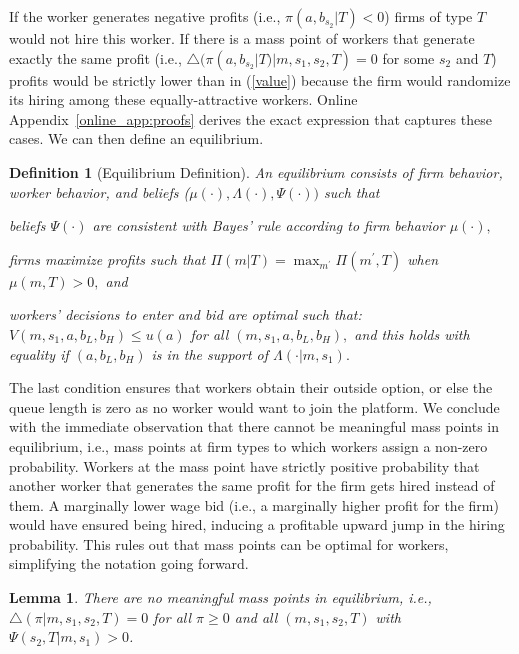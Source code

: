 \documentclass[12pt]{article}
\newtheorem*{definition*}{Definition}
\newtheorem*{lemma*}{Lemma}
\begin{document}
If the worker generates negative profits (i.e., $\pi (a,b_{s_2}|T) < 0$) firms of type $T$ would not hire this worker. If there is a mass point of workers that generate exactly the same profit (i.e., $\bigtriangleup (\pi
(a,b_{s_2}|T)|m,s_{1},s_{2},T)=0$ for some $s_2$ and $T$) profits would be strictly lower than in (\ref{value}) because the firm would randomize its hiring among these equally-attractive workers. Online Appendix~\ref{online_app:proofs} derives the exact expression that captures these cases. We can then define an equilibrium.

\begin{definition*}[Equilibrium Definition]
An equilibrium consists of firm behavior, worker behavior, and beliefs ($%
\mu (\cdot ),\Lambda (\cdot ),\Psi (\cdot ))$ such that
\begin{enumerate}[label={[\arabic*]}]
\item beliefs $\Psi (\cdot )$ are consistent with Bayes' rule according
to firm behavior $\mu (\cdot ),$

\item firms maximize profits such that $\Pi (m|T)=\max_{m^{\prime }}\Pi
(m^{\prime },T)$ when $\mu (m,T)>0,$ and

\item workers' decisions to enter and bid are optimal such that: $%
V(m,s_{1},a,b_{L},b_{H})\leq u(a)$ for all $(m,s_{1},a,b_{L},b_{H}),$ and
this holds with equality if $(a,b_{L},b_{H})$ is in the support of $\Lambda
(\cdot |m,s_{1}).$
\end{enumerate}
\end{definition*}

The last condition ensures that workers obtain their outside option, or else the queue length is zero as no worker would want to join the platform. 
We conclude with the immediate observation that there cannot be meaningful
mass points in equilibrium, i.e., mass points at firm types to which workers assign a non-zero probability. 
Workers at the mass point have strictly positive probability that another worker that generates the same profit for the firm gets hired instead of them. 
A marginally lower wage bid (i.e., a marginally higher profit for the firm) would have ensured being hired, inducing a profitable upward jump in the hiring probability. This rules out that mass points can be optimal for workers, simplifying the notation going forward.

\begin{lemma*}
\label{no-mass-point-lemma}There are no meaningful mass points in
equilibrium, i.e., $\bigtriangleup (\pi |m,s_{1},s_{2},T)=0$ for all $\pi
\geq 0$ and all $(m,s_{1},s_{2},T)$ with $\Psi (s_{2},T|m,s_{1})>0$.
\end{lemma*}
\end{document}
